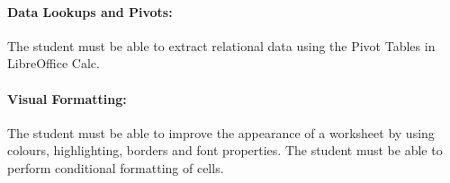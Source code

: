             \paragraph{Data Lookups and Pivots:}
                The student must be able to extract relational data using the
                Pivot Tables in LibreOffice Calc.

            \paragraph{Visual Formatting:}
                The student must be able to improve the appearance of a
                worksheet by using colours, highlighting, borders and font
                properties. The student must be able to perform conditional
                formatting of cells.
